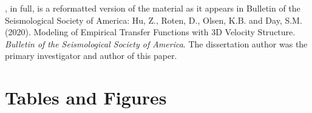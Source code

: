, in full, is a reformatted version of the material as it appears in Bulletin of the Seismological Society of America: Hu, Z., Roten, D., Olsen, K.B. and Day, S.M. (2020). Modeling of Empirical Transfer Functions with 3D Velocity Structure. \emph{Bulletin of the Seismological Society of America}. The dissertation author was the primary investigator and author of this paper.

\newpage
\section*{Tables and Figures}
%


